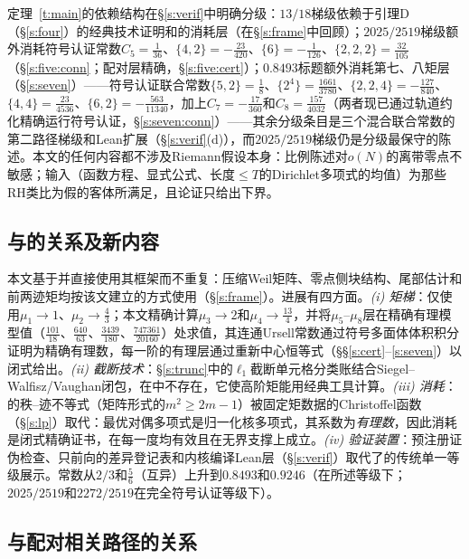 \documentclass[11pt]{article}
\numberwithin{equation}{section}
\theoremstyle{definition}
\theoremstyle{remark}
\begin{document}
定理~\ref{t:main}的依赖结构在\S\ref{s:verif}中明确分级：$13/18$梯级依赖于引理D（\S\ref{s:four}）的经典技术证明和\cite{C26}的消耗层（在\S\ref{s:frame}中回顾）；$2025/2519$梯级额外消耗符号认证常数$C_5=\tfrac1{36}$、$\{4,2\}=-\tfrac{23}{420}$、$\{6\}=-\tfrac1{126}$、$\{2,2,2\}=\tfrac{32}{105}$（\S\ref{s:five:conn}；配对层精确，\S\ref{s:five:cert}）；$0.8493$标题额外消耗第七、八矩层（\S\ref{s:seven}）——符号认证联合常数$\{5,2\}=\tfrac18$、$\{2^4\}=\tfrac{1661}{3780}$、$\{2,2,4\}=-\tfrac{127}{840}$、$\{4,4\}=\tfrac{23}{4536}$、$\{6,2\}=-\tfrac{563}{11340}$，加上$C_7=-\tfrac{17}{360}$和$C_8=\tfrac{157}{4032}$（两者现已通过轨道约化精确运行符号认证，\S\ref{s:seven:conn}）——其余分级条目是三个混合联合常数的第二路径梯级和Lean扩展（\S\ref{s:verif}(d)），而$2025/2519$梯级仍是分级最保守的陈述。本文的任何内容都不涉及Riemann假设本身：比例陈述对$o(N)$的离带零点不敏感；输入（函数方程、显式公式、长度$\le T$的Dirichlet多项式的均值）为那些RH类比为假的客体所满足，且论证只给出下界\cite[\S1.5]{C26}。

\subsection*{与\cite{C26}的关系及新内容}

本文基于\cite{C26}并直接使用其框架而不重复：压缩Weil矩阵、零点侧块结构、尾部估计和前两迹矩均按该文建立的方式使用（\S\ref{s:frame}）。进展有四方面。\emph{(i) 矩梯}：\cite{C26}仅使用$\mu_1\to1$、$\mu_2\to\tfrac43$；本文精确计算$\mu_3\to2$和$\mu_4\to\tfrac{13}4$，并将$\mu_5$--$\mu_8$层在精确有理模型值（$\tfrac{101}{18}$、$\tfrac{640}{63}$、$\tfrac{3439}{180}$、$\tfrac{747361}{20160}$）处求值，其连通Ursell常数通过符号多面体体积积分证明为精确有理数，每一阶的有理层通过重新中心恒等式（\S\S\ref{s:cert}--\ref{s:seven}）以闭式给出。\emph{(ii) 截断技术}：\S\ref{s:trunc}中的$\ell_1$截断单元格分类账结合Siegel--Walfisz/Vaughan闭包，在\cite{C26}中不存在，它使高阶矩能用经典工具计算。\emph{(iii) 消耗}：\cite[引理3.2]{C26}的秩--迹不等式（矩阵形式的$m^{2}\ge2m-1$）被固定矩数据的Christoffel函数（\S\ref{s:lp}）取代：最优对偶多项式是归一化核多项式，其系数为\emph{有理数}，因此消耗是闭式精确证书，在每一度均有效且在无界支撑上成立。\emph{(iv) 验证装置}：预注册证伪检查、只前向的差异登记表和内核编译Lean层（\S\ref{s:verif}）取代了\cite{C26}的传统单一等级展示。常数从$2/3$和$\tfrac56$（互异）上升到$0.8493$和$0.9246$（在所述等级下；$2025/2519$和$2272/2519$在完全符号认证等级下）。

\subsection*{与配对相关路径的关系}
\end{document}
